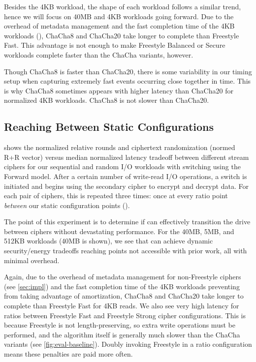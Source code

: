 Besides the 4KB workload, the shape of each workload follows a similar trend,
hence we will focus on 40MB and 4KB workloads going forward. Due to the overhead
of metadata management and the fast completion time of the 4KB workloads
(), ChaCha8 and ChaCha20 take
longer to complete than Freestyle Fast. This advantage is not enough to make
Freestyle Balanced or Secure workloads complete faster than the ChaCha variants,
however.

Though ChaCha8 is faster than ChaCha20, there is some variability in our timing
setup when capturing extremely fast events occurring close together in time.
This is why ChaCha8 sometimes appears with higher latency than ChaCha20 for
normalized 4KB workloads. ChaCha8 is not slower than ChaCha20.


\subsection{Reaching Between Static Configurations}\label{subsec:eval-dynamic}



 shows the normalized relative rounds and ciphertext
randomization (normed R+R vector) versus median normalized latency tradeoff
between different stream ciphers for our sequential and random I/O workloads
with switching using the Forward model. After a certain number of write-read I/O
operations, a switch is initiated and \sys begins using the secondary cipher to
encrypt and decrypt data. For each pair of ciphers, this is repeated three
times: once at every ratio point {\em between} our static configuration points
().

The point of this experiment is to determine if \sys can effectively transition
the drive between ciphers without devastating performance. For the 40MB, 5MB,
and 512KB workloads (40MB is shown), we see that \sys can achieve dynamic
security/energy tradeoffs reaching points not accessible with prior work, all
with minimal overhead.

Again, due to the overhead of metadata management for non-Freestyle ciphers (see
\cref{sec:impl}) and the fast completion time of the 4KB workloads preventing
\sys from taking advantage of amortization, ChaCha8 and ChaCha20 take longer to
complete than Freestyle Fast for 4KB reads. We also see very high latency for
ratios between Freestyle Fast and Freestyle Strong cipher configurations. This
is because Freestyle is not length-preserving, so extra write operations must be
performed, and the algorithm itself is generally much slower than the ChaCha
variants (see \cref{fig:eval-baseline}). Doubly invoking Freestyle in a ratio
configuration means these penalties are paid more often.


